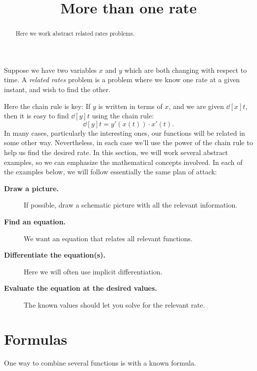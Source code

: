 \documentclass{ximera}
\title[Dig-In:]{More than one rate}
\begin{document}
\begin{abstract}
  Here we work abstract related rates problems.
\end{abstract}
\maketitle


Suppose we have two variables $x$ and $y$ which are both changing with
respect to time.  A \textit{related rates} problem is a problem where
we know one rate at a given instant, and wish to find the other.

Here the chain rule is key: If $y$ is written in terms of $x$, and we
are given $\dd[x]{t}$, then it is easy to find $\dd[y]{t}$ using the
chain rule:
\[
\dd[y]{t}=y'(x(t))\cdot x'(t).
\]
In many cases, particularly the interesting ones, our functions will
be related in some other way. Nevertheless, in each case we'll use the
power of the chain rule to help us find the desired rate. In this
section, we will work several abstract examples, so we can emphasize
the mathematical concepts involved. In each of the examples below, we will follow essentially the same plan of attack:

\begin{description}
\item[\textbf{Draw a picture.}] If possible, draw a schematic picture with all the relevant information. 
\item[\textbf{Find an equation.}] We want an equation that relates all
  relevant functions.
\item[\textbf{Differentiate the equation(s).}] Here we will often use
  implicit differentiation.
\item[\textbf{Evaluate the equation at the desired values.}] The known
  values should let you solve for the relevant rate.
\end{description}


\section{Formulas}

One way to combine several functions is with a known formula.
\end{document}
